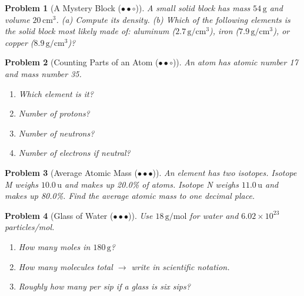 \documentclass[a4paper,11pt]{article}
\newcommand{\medium}{(\ensuremath{\bullet \bullet \circ})}
\newcommand{\hard}{(\ensuremath{\bullet \bullet \bullet})}
\theoremstyle{listprobstyle}
\newtheorem{problem}{Problem}
\begin{document}
\begin{problem}[A Mystery Block \medium]
A small solid block has mass $54\,\mathrm{g}$ and volume
$20\,\mathrm{cm^3}$. (a) Compute its density. (b) Which of the
following elements is the solid block most likely made of:
aluminum ($2.7\,\mathrm{g/cm^3}$), iron ($7.9\,\mathrm{g/cm^3}$),
or copper ($8.9\,\mathrm{g/cm^3}$)?
\end{problem}

\newpage

\begin{problem}[Counting Parts of an Atom \medium]
An atom has atomic number 17 and mass number 35.
\vspace{-0.6\baselineskip}
\begin{enumerate}[label=\alph*),itemsep=0pt,parsep=0pt,topsep=0pt]
\item Which element is it?
\item Number of protons?
\item Number of neutrons?
\item Number of electrons if neutral?
\end{enumerate}
\end{problem}

\vfill

\begin{problem}[Average Atomic Mass \hard]
An element has two isotopes. Isotope M weighs $10.0\,\mathrm{u}$
and makes up 20.0\% of atoms. Isotope N weighs $11.0\,\mathrm{u}$
and makes up 80.0\%. Find the average atomic mass to one decimal
place.
\end{problem}

\vfill

\begin{problem}[Glass of Water \hard]
Use $18\,\mathrm{g/mol}$ for water and $6.02 \times 10^{23}$
particles/mol.
\vspace{-0.6\baselineskip}
\begin{enumerate}[label=\alph*),itemsep=0pt,parsep=0pt,topsep=0pt]
\item How many moles in $180\,\mathrm{g}$?
\item How many molecules total $\rightarrow$ write in scientific
notation.
\item Roughly how many per sip if a glass is six sips?
\end{enumerate}
\end{problem}

\vspace{12\baselineskip}
\end{document}
